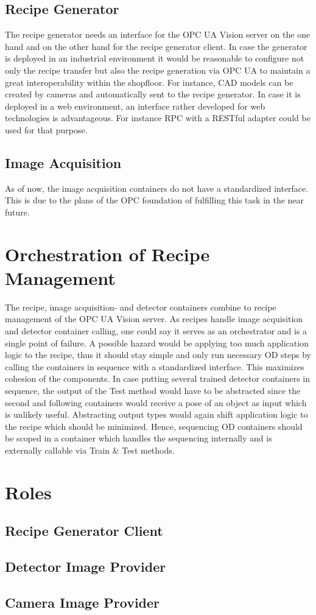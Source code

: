 \subsection{Recipe Generator}
The recipe generator needs an interface for the OPC UA Vision server on the one hand and on the other hand for the recipe generator client. In case the generator is deployed in an industrial environment it would be reasonable to configure not only the recipe transfer but also the recipe generation via OPC UA to maintain a great interoperability within the shopfloor. For instance, CAD models can be created by cameras and automatically sent to the recipe generator. In case it is deployed in a web environment, an interface rather developed for web technologies is advantageous. For instance RPC with a RESTful adapter could be used for that purpose.

\subsection{Image Acquisition}
As of now, the image acquisition containers do not have a standardized interface. This is due to the plans of the OPC foundation of fulfilling this task in the near future.

\section{Orchestration of Recipe Management}
The recipe, image acquisition- and  detector containers combine to recipe management of the OPC UA Vision server. As recipes handle image acquisition and detector container calling, one could say it serves as an orchestrator and is a single point of failure. A possible hazard would be applying too much application logic to the recipe, thus it should stay simple and only run necessary OD steps by calling the containers in sequence with a standardized interface. This maximizes cohesion of the components. In case putting several trained detector containers in sequence, the output of the Test method would have to be abstracted since the second and following containers would receive a pose of an object as input which is unlikely useful. Abstracting output types would again shift application logic to the recipe which should be minimized. Hence, sequencing OD containers should be scoped in a container which handles the sequencing internally and is externally callable via Train \& Test methods.

\section{Roles}
\subsection{Recipe Generator Client}

\subsection{Detector Image Provider}

\subsection{Camera Image Provider}
